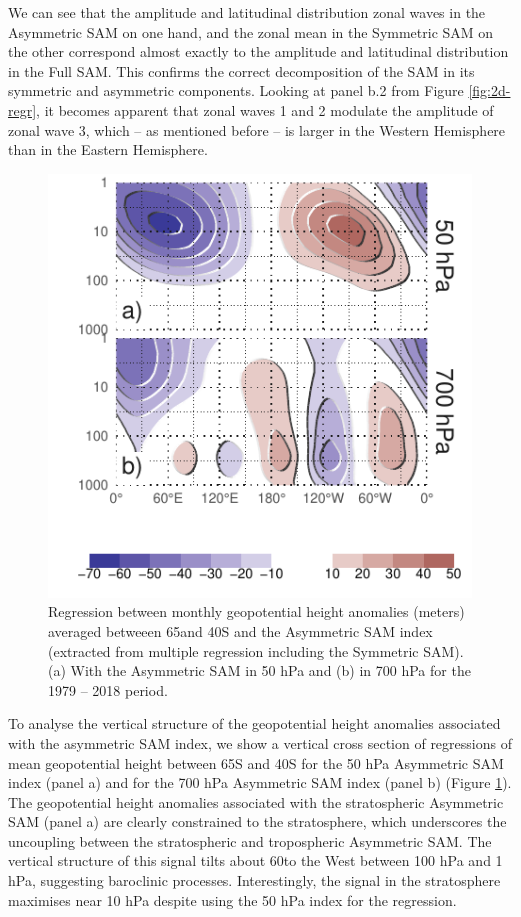 \documentclass[smallextended]{svjour3}       %
\begin{document}
We can see that the amplitude and latitudinal distribution zonal waves in the Asymmetric SAM on one hand, and the zonal mean in the Symmetric SAM on the other correspond almost exactly to the amplitude and latitudinal distribution in the Full SAM. This confirms the correct decomposition of the SAM in its symmetric and asymmetric components. Looking at panel b.2 from Figure \ref{fig:2d-regr}, it becomes apparent that zonal waves 1 and 2 modulate the amplitude of zonal wave 3, which -- as mentioned before -- is larger in the Western Hemisphere than in the Eastern Hemisphere.

\begin{figure}
\includegraphics{vertical-regression-1} \caption{Regression between monthly geopotential height anomalies (meters) averaged betweeen 65\degree and 40\degree S and the Asymmetric SAM index (extracted from multiple regression including the Symmetric SAM). (a) With the Asymmetric SAM in 50 hPa and (b) in 700 hPa for the 1979 -- 2018 period.}\label{fig:vertical-regression}
\end{figure}

To analyse the vertical structure of the geopotential height anomalies associated with the asymmetric SAM index, we show a vertical cross section of regressions of mean geopotential height between 65\degree S and 40\degree S for the 50 hPa Asymmetric SAM index (panel a) and for the 700 hPa Asymmetric SAM index (panel b) (Figure \ref{fig:vertical-regression}). The geopotential height anomalies associated with the stratospheric Asymmetric SAM (panel a) are clearly constrained to the stratosphere, which underscores the uncoupling between the stratospheric and tropospheric Asymmetric SAM. The vertical structure of this signal tilts about 60\degree to the West between 100 hPa and 1 hPa, suggesting baroclinic processes. Interestingly, the signal in the stratosphere maximises near 10 hPa despite using the 50 hPa index for the regression.
\end{document}
